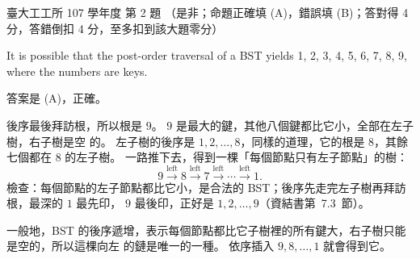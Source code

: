 \begin{pastexam}[label={px:ntu-107-ie-ds-02}]{臺大工工所 107 學年度 第 2 題}
（是非；命題正確填 (A)，錯誤填 (B)；答對得 4 分，答錯倒扣 4 分，至多扣到該大題零分）

It is possible that the post-order traversal of a BST yields 1, 2, 3, 4, 5, 6, 7, 8, 9, where the numbers are keys.
\end{pastexam}

\begin{pastsoln}
答案是 (A)，正確。

後序最後拜訪根，所以根是 $9$。 $9$ 是最大的鍵，其他八個鍵都比它小，全部在左子樹，右子樹是空
的。 左子樹的後序是 $1, 2, \ldots, 8$，同樣的道理，它的根是 $8$，其餘七個都在 $8$ 的左子樹。
一路推下去，得到一棵「每個節點只有左子節點」的樹：
\[
9 \xrightarrow{\text{left}} 8 \xrightarrow{\text{left}} 7 \xrightarrow{\text{left}} \cdots
\xrightarrow{\text{left}} 1.
\]
檢查：每個節點的左子節點都比它小，是合法的 BST；後序先走完左子樹再拜訪根，最深的 $1$ 最先印，
$9$ 最後印，正好是 $1, 2, \ldots, 9$（資結書第~7.3~節）。

一般地，BST 的後序遞增，表示每個節點都比它子樹裡的所有鍵大，右子樹只能是空的，所以這棵向左
的鏈是唯一的一種。 依序插入 $9, 8, \ldots, 1$ 就會得到它。
\end{pastsoln}
